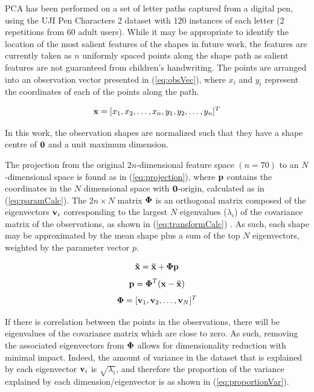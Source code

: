 \documentclass{sig-alternate}
\begin{document}
PCA has been performed on a set of letter paths captured from a digital pen,
using the UJI Pen Characters 2 dataset \cite{Llorens2008} with 120 instances of
each letter (2 repetitions from 60 adult users). While it may be appropriate to
identify the location of the most salient features of the shapes in future work,
the features are currently taken as $n$ uniformly spaced points along the shape
path as salient features are not guaranteed from children's handwriting. The
points are arranged into an observation vector presented in (\ref{eq:obsVec}),
where $x_i$ and $y_i$ represent the coordinates of each of the points along the
path.

\begin{equation}\label{eq:obsVec}
{\bf x} = [x_1, x_2, \ldots, x_n, y_1, y_2, \ldots, y_n]^T
\end{equation}

In this work, the observation shapes are normalized such that they have a shape
centre of ${\bf 0}$ and a unit maximum dimension. 

The projection from the original $2n$-dimensional feature space $(n=70)$ to an
$N$-dimensional space is found as in (\ref{eq:projection}), where ${\bf p}$
contains the coordinates in the $N$ dimensional space with ${\bf 0}$-origin,
calculated as in (\ref{eq:paramCalc}). The $2n\times N$ matrix ${\bf \Phi }$ is
an orthogonal matrix composed of the eigenvectors ${\bf v}_i$ corresponding to
the largest $N$ eigenvalues ($\lambda_i$) of the covariance matrix of the
observations, as shown in (\ref{eq:transformCalc}) \cite{Stegmann2002}. As such,
each shape may be approximated by the mean shape plus a sum of the top $N$
eigenvectors, weighted by the parameter vector $p$. 

\begin{equation}\label{eq:projection}
{\bf \tilde{x}=\bar{x}+\Phi p}
\end{equation}
\begin{equation}\label{eq:paramCalc}
{\bf p} ={\bf \Phi}^T ({\bf {x}-\bar{x}})
\end{equation}
\begin{equation}\label{eq:transformCalc}
{\bf \Phi} = [{\bf v}_1, {\bf v}_2, \ldots, {\bf v}_N]^T
\end{equation}

If there is correlation between the points in the observations, there will be
eigenvalues of the covariance matrix which are close to zero. As such, removing
the associated eigenvectors from ${\bf \Phi}$ allows for dimensionality
reduction with minimal impact. Indeed, the amount of variance in the dataset
that is explained by each eigenvector ${\bf v}_i$ is $\sqrt{\lambda_i}$, and
therefore the proportion of the variance explained by each dimension/eigenvector
is as shown in (\ref{eq:proportionVar}).
\end{document}
